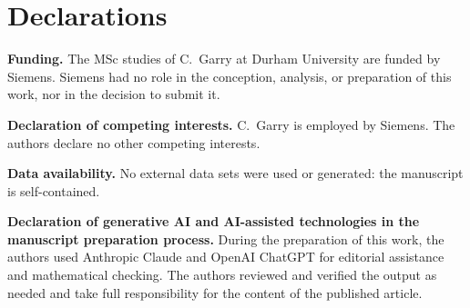 \documentclass[preprint,12pt]{elsarticle}
\numberwithin{equation}{section}
\theoremstyle{plain}
\theoremstyle{definition}
\theoremstyle{\PaperRemarkStyle}
\begin{document}
 \section*{Declarations}

\noindent\textbf{Funding.} The MSc studies of C.~Garry at Durham University are funded by
Siemens. Siemens had no role in the conception, analysis, or preparation of this work, nor
in the decision to submit it.

\noindent\textbf{Declaration of competing interests.} C.~Garry is employed by Siemens. The
authors declare no other competing interests.

\noindent\textbf{Data availability.} No external data sets were used or generated: the
manuscript is self-contained.

\noindent\textbf{Declaration of generative AI and AI-assisted technologies in the
manuscript preparation process.}
During the preparation of this work, the authors used Anthropic Claude and OpenAI ChatGPT
for editorial assistance and mathematical checking. The authors reviewed and verified the
output as needed and take full responsibility for the content of the published article.
\end{document}
